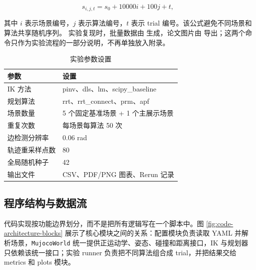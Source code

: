 \documentclass[UTF8,zihao=-4]{ctexart}
\begin{document}
\begin{equation}
  s_{i,j,t}
  =
  s_0+10000i+100j+t ,
  \label{eq:seed}
\end{equation}

其中 $i$ 表示场景编号，$j$ 表示算法编号，$t$ 表示 trial 编号。该公式避免不同场景和算法共享随机序列。
实验复现时，批量数据由  生成，论文图片由  导出；这两个命令只作为实验流程的一部分说明，不再单独放入附录。

\begin{table}[!htbp]
  \centering
  \caption{实验参数设置}
  \label{tab:params}
  \begin{tabularx}{\textwidth}{p{4.0cm}X}
    \toprule
    参数 & 设置 \\
    \midrule
    IK 方法 & pinv、dls、lm、scipy\_baseline \\
    规划算法 & rrt、rrt\_connect、prm、apf \\
    场景数量 & 5 个固定基准场景 + 1 个主展示场景 \\
    重复次数 & 每场景每算法 50 次 \\
    边检测分辨率 & 0.06 rad \\
    轨迹重采样点数 & 80 \\
    全局随机种子 & 42 \\
    输出文件 & CSV、PDF/PNG 图表、Rerun 记录 \\
    \bottomrule
  \end{tabularx}
\end{table}

\subsection{程序结构与数据流}
代码实现按功能边界划分，而不是把所有逻辑写在一个脚本中。图 \ref{fig:code-architecture-blocks} 展示了核心模块之间的关系：配置模块负责读取 YAML 并解析场景，\texttt{MujocoWorld} 统一提供正运动学、姿态、碰撞和距离接口，IK 与规划器只依赖该统一接口；实验 runner 负责把不同算法组合成 trial，并把结果交给 metrics 和 plots 模块。
\end{document}
